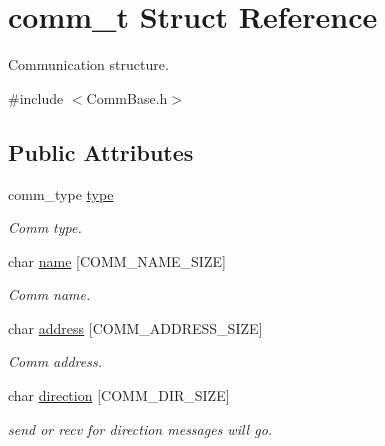 \hypertarget{structcomm__t}{}\section{comm\+\_\+t Struct Reference}
\label{structcomm__t}


Communication structure.  




{\ttfamily \#include $<$Comm\+Base.\+h$>$}

\subsection*{Public Attributes}
\begin{DoxyCompactItemize}
\item 
\mbox{\label{structcomm__t_a9bd691f3ae56e098b9edff7ad1628b3b}} 
comm\+\_\+type \mbox{\hyperlink{structcomm__t_a9bd691f3ae56e098b9edff7ad1628b3b}{type}}
\begin{DoxyCompactList}\small\item\em Comm type. \end{DoxyCompactList}\item 
\mbox{\label{structcomm__t_a0c8b237f48a50a181eab8447a87ec172}} 
char \mbox{\hyperlink{structcomm__t_a0c8b237f48a50a181eab8447a87ec172}{name}} \mbox{[}C\+O\+M\+M\+\_\+\+N\+A\+M\+E\+\_\+\+S\+I\+ZE\mbox{]}
\begin{DoxyCompactList}\small\item\em Comm name. \end{DoxyCompactList}\item 
\mbox{\label{structcomm__t_aca2bf1fc2b62c779c50848501f31fbf0}} 
char \mbox{\hyperlink{structcomm__t_aca2bf1fc2b62c779c50848501f31fbf0}{address}} \mbox{[}C\+O\+M\+M\+\_\+\+A\+D\+D\+R\+E\+S\+S\+\_\+\+S\+I\+ZE\mbox{]}
\begin{DoxyCompactList}\small\item\em Comm address. \end{DoxyCompactList}\item 
\mbox{\label{structcomm__t_a1940bbad161f8cf5f868ff4cf4e95cda}} 
char \mbox{\hyperlink{structcomm__t_a1940bbad161f8cf5f868ff4cf4e95cda}{direction}} \mbox{[}C\+O\+M\+M\+\_\+\+D\+I\+R\+\_\+\+S\+I\+ZE\mbox{]}
\begin{DoxyCompactList}\small\item\em send or recv for direction messages will go. \end{DoxyCompactList}\item 

\end{DoxyCompactItemize}
